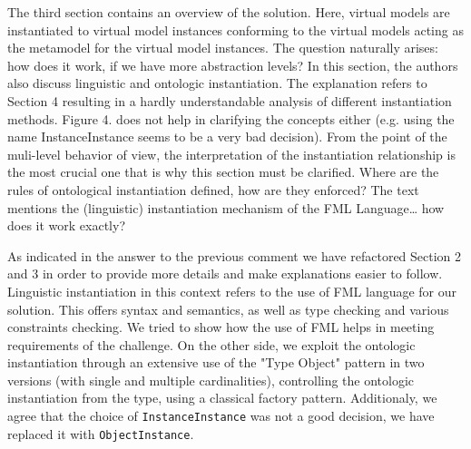 \documentclass[10pt]{article}
\begin{document}
\begin{response}{The third section contains an overview of the solution. Here, virtual models are instantiated to virtual model instances conforming to the virtual models acting as the metamodel for the virtual model instances. The question naturally arises: how does it work, if we have more abstraction levels?  In this section, the authors also discuss linguistic and ontologic instantiation. The explanation refers to Section 4 resulting in a hardly understandable analysis of different instantiation methods. Figure 4. does not help in clarifying the concepts either (e.g. using the name InstanceInstance seems to be a very bad decision). From the point of the muli-level behavior of view, the interpretation of the instantiation relationship is the most crucial one that is why this section must be clarified. Where are the rules of ontological instantiation defined, how are they enforced? The text mentions the (linguistic) instantiation mechanism of the FML Language… how does it work exactly?}



As indicated in the answer to the previous comment we have refactored Section 2 and 3 in order to provide more details and make explanations easier to follow. Linguistic instantiation in this context refers to the use of FML language for our solution. This offers syntax and semantics, as well as type checking and various constraints checking. We tried to show how the use of FML helps in meeting requirements of the challenge. On the other side, we exploit the ontologic instantiation through an extensive use of the "Type Object" pattern in two versions (with single and multiple cardinalities), controlling the ontologic instantiation from the type, using a classical factory pattern. Additionaly, we agree that the choice of \texttt{InstanceInstance} was not a good decision, we have replaced it with \texttt{ObjectInstance}.%

\end{response}
\end{document}
